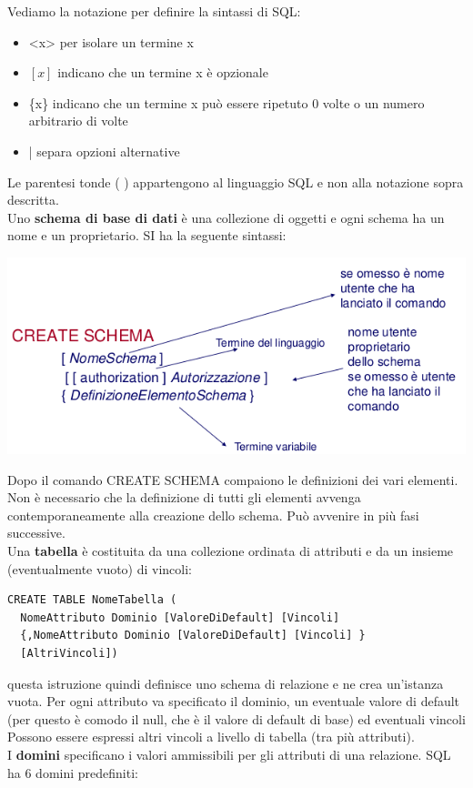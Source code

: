 \documentclass[a4paper,12pt, oneside]{book}
\begin{document}
Vediamo la notazione per definire la sintassi di SQL:
\begin{itemize}
\item <x> per isolare un termine x
\item $[x]$ indicano che un termine x è opzionale
\item \{x\} indicano che un termine x può essere ripetuto 0
volte o un numero arbitrario di volte
\item | separa opzioni alternative
\end{itemize}
Le parentesi tonde ( ) appartengono al linguaggio
SQL e non alla notazione sopra descritta.\\
Uno \textbf{schema di base di dati} è una collezione di oggetti e ogni schema ha un nome e un proprietario. SI ha la seguente sintassi:
\begin{center}
	\includegraphics[scale=2.5]{img/sch.png}
\end{center}
Dopo il comando CREATE SCHEMA compaiono le
definizioni dei vari elementi. Non è necessario che la definizione di tutti gli elementi avvenga contemporaneamente alla creazione dello schema. Può avvenire in più fasi successive.\\
Una \textbf{tabella} è costituita da una collezione ordinata
di attributi e da un insieme (eventualmente vuoto) di
vincoli:
\begin{verbatim}
CREATE TABLE NomeTabella (
  NomeAttributo Dominio [ValoreDiDefault] [Vincoli]
  {,NomeAttributo Dominio [ValoreDiDefault] [Vincoli] }
  [AltriVincoli])
\end{verbatim}
questa istruzione quindi definisce uno schema di relazione e ne crea un'istanza vuota. Per ogni attributo va specificato il dominio, un eventuale valore di default (per questo è comodo il null, che è il valore di default di base) ed eventuali vincoli Possono essere espressi altri vincoli a livello di tabella (tra più attributi).
\\ I \textbf{domini} specificano i valori ammissibili per gli attributi di una relazione. SQL ha 6 domini predefiniti:
\end{document}
